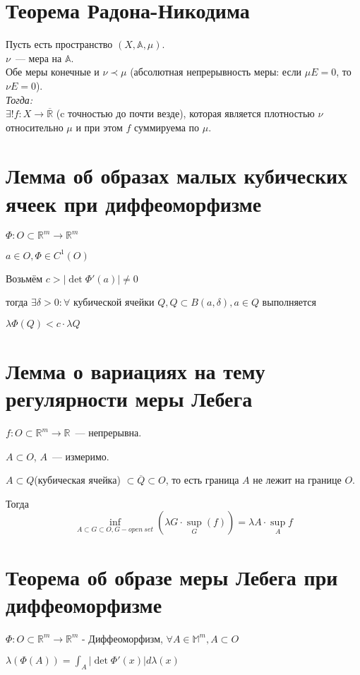 \documentclass[paper=a4, fontsize=14pt]{report}
\begin{document}
\section{Теорема Радона-Никодима}
	Пусть есть пространство $(X, \mathbb{A}, \mu)$. \\
	$\nu$~--- мера на $\mathbb{A}$. \\
	Обе меры конечные и $\nu \prec \mu$ (абсолютная непрерывность меры: если $\mu E = 0$, то $\nu E = 0$). \\
	\emph{Тогда: } \\
		$\exists! f: X \rightarrow \overline{\mathds{R}}$ (c точностью до почти везде), которая является плотностью $\nu$ относительно $\mu$ и при этом $f$ суммируема по $\mu$.

\section{Лемма об образах малых кубических ячеек при диффеоморфизме}
$\Phi: O \subset \mathds{R}^m \rightarrow \mathds{R}^m$

$a \in O, \Phi \in C^1(O)$

Возьмём $c > |\det \Phi'(a)| \neq 0$

тогда $\exists \delta > 0: \forall$ кубической ячейки $Q, Q \subset B(a, \delta), a \in Q$ выполняется

$\lambda \Phi(Q) < c \cdot \lambda Q$

\section{Лемма о вариациях на тему регулярности меры Лебега}
$f: O \subset \mathds{R}^m \rightarrow \mathds{R}$~--- непрерывна.

$A \subset O$, $A$~--- измеримо.

$A \subset Q$(кубическая ячейка) $\subset \overline Q \subset O$, то есть граница $A$ не лежит на границе $O$.

Тогда $$\inf_{A \subset G \subset O, G - open ~ set} (\lambda G \cdot \sup_G(f)) = \lambda A \cdot \sup_A f$$

\section{Теорема об образе меры Лебега при диффеоморфизме}
$\Phi: O \subset \mathds{R}^m \rightarrow \mathds{R}^m$ - Диффеоморфизм, $\forall A \in \mathds{M}^m, A \subset O$

$\lambda(\Phi(A)) = \int_A |\det \Phi' (x)| d \lambda(x)$
\end{document}
